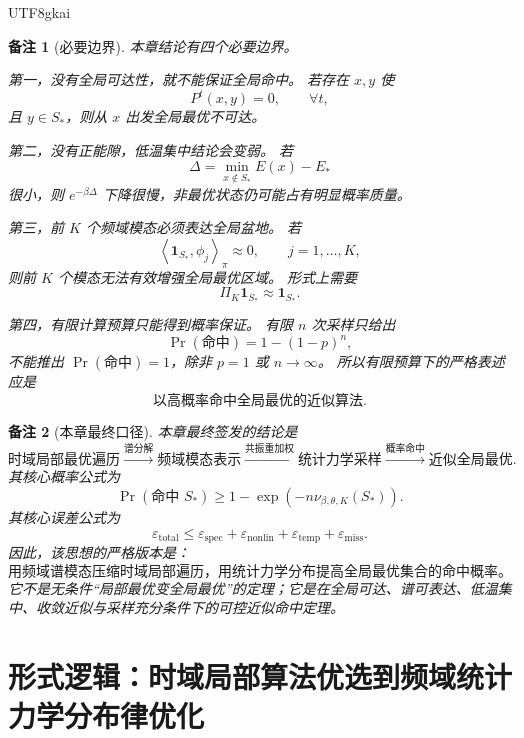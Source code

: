 \documentclass[12pt]{article}
\newtheorem{remark}{备注}[section]
\begin{document}
\begin{CJK*}{UTF8}{gkai}
\begin{remark}[必要边界]
本章结论有四个必要边界。

第一，没有全局可达性，就不能保证全局命中。
若存在 \(x,y\) 使
\[
  P^t(x,y)=0,\qquad \forall t,
\]
且 \(y\in S_*\)，则从 \(x\) 出发全局最优不可达。

第二，没有正能隙，低温集中结论会变弱。
若
\[
  \Delta=\min_{x\notin S_*}E(x)-E_*
\]
很小，则 \(e^{-\beta\Delta}\) 下降很慢，非最优状态仍可能占有明显概率质量。

第三，前 \(K\) 个频域模态必须表达全局盆地。
若
\[
  \left\langle \mathbf 1_{S_*},\phi_j\right\rangle_{\pi}\approx0,
  \qquad
  j=1,\ldots,K,
\]
则前 \(K\) 个模态无法有效增强全局最优区域。
形式上需要
\[
  \Pi_K\mathbf 1_{S_*}\approx \mathbf 1_{S_*}.
\]

第四，有限计算预算只能得到概率保证。
有限 \(n\) 次采样只给出
\[
  \Pr(\text{命中})=1-(1-p)^n,
\]
不能推出 \(\Pr(\text{命中})=1\)，除非 \(p=1\) 或 \(n\to\infty\)。
所以有限预算下的严格表述应是
\[
  \boxed{
  \text{以高概率命中全局最优的近似算法}
  }.
\]
\end{remark}

\begin{remark}[本章最终口径]
本章最终签发的结论是
\[
  \boxed{
  \text{时域局部最优遍历}
  \xrightarrow{\text{谱分解}}
  \text{频域模态表示}
  \xrightarrow{\text{共振重加权}}
  \text{统计力学采样}
  \xrightarrow{\text{概率命中}}
  \text{近似全局最优}.
  }
\]
其核心概率公式为
\[
  \boxed{
  \Pr(\text{命中 }S_*)
  \ge
  1-
  \exp\left(
  -n\nu_{\beta,\theta,K}(S_*)
  \right)
  }.
\]
其核心误差公式为
\[
  \boxed{
  \varepsilon_{\mathrm{total}}
  \le
  \varepsilon_{\mathrm{spec}}
  +
  \varepsilon_{\mathrm{nonlin}}
  +
  \varepsilon_{\mathrm{temp}}
  +
  \varepsilon_{\mathrm{miss}}.
  }
\]
因此，该思想的严格版本是：
\[
  \boxed{
  \text{用频域谱模态压缩时域局部遍历，用统计力学分布提高全局最优集合的命中概率。}
  }
\]
它不是无条件“局部最优变全局最优”的定理；它是在全局可达、谱可表达、低温集中、收敛近似与采样充分条件下的可控近似命中定理。
\end{remark}

\clearpage

\section{形式逻辑：时域局部算法优选到频域统计力学分布律优化}
\label{sec:tex55-local-algorithm-to-law-selection}


\end{CJK*}
\end{document}
